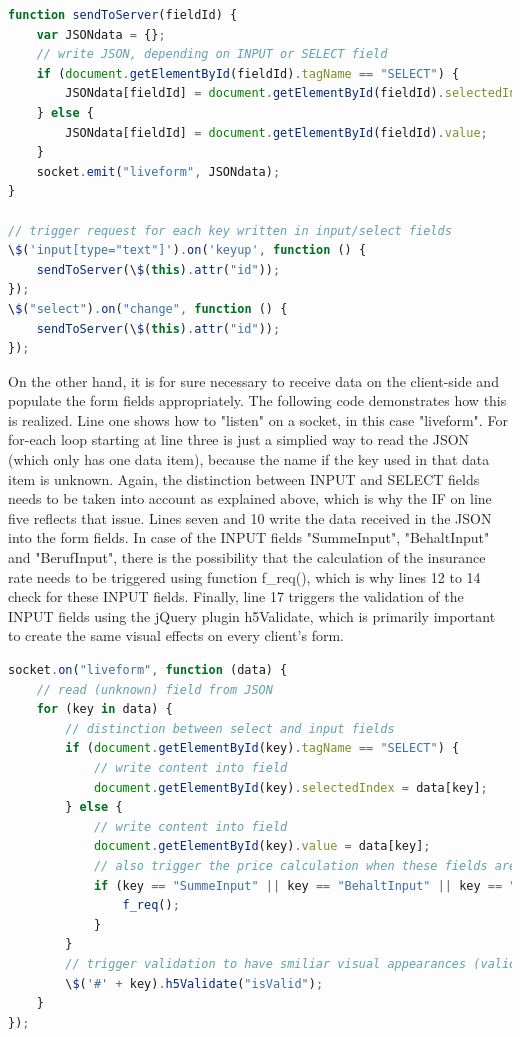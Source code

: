 \begin{lstlisting}[language=javascript,caption={Sending data to the server}]
function sendToServer(fieldId) {
    var JSONdata = {};
    // write JSON, depending on INPUT or SELECT field
    if (document.getElementById(fieldId).tagName == "SELECT") {
        JSONdata[fieldId] = document.getElementById(fieldId).selectedIndex;
    } else {
        JSONdata[fieldId] = document.getElementById(fieldId).value;
    }
    socket.emit("liveform", JSONdata);
}

// trigger request for each key written in input/select fields
\$('input[type="text"]').on('keyup', function () {
    sendToServer(\$(this).attr("id"));
});
\$("select").on("change", function () {
    sendToServer(\$(this).attr("id"));
});
\end{lstlisting}

On the other hand, it is for sure necessary to receive data on the client-side and populate the form fields appropriately. The following code demonstrates how this is realized. Line one shows how to "listen" on a socket, in this case "liveform". For for-each loop starting at line three is just a simplied way to read the JSON (which only has one data item), because the name if the key used in that data item is unknown. Again, the distinction between INPUT and SELECT fields needs to be taken into account as explained above, which is why the IF on line five reflects that issue. Lines seven and 10 write the data received in the JSON into the form fields. In case of the INPUT fields "SummeInput", "BehaltInput" and "BerufInput", there is the possibility that the calculation of the insurance rate needs to be triggered using function f\_req(), which is why lines 12 to 14 check for these INPUT fields. Finally, line 17 triggers the validation of the INPUT fields using the jQuery plugin h5Validate, which is primarily important to create the same visual effects on every client's form.

\begin{lstlisting}[language=javascript,caption={Receiving data using WebSockets}]
socket.on("liveform", function (data) {
    // read (unknown) field from JSON
    for (key in data) {
        // distinction between select and input fields
        if (document.getElementById(key).tagName == "SELECT") {
            // write content into field
            document.getElementById(key).selectedIndex = data[key];
        } else {
            // write content into field
            document.getElementById(key).value = data[key];
            // also trigger the price calculation when these fields are filled
            if (key == "SummeInput" || key == "BehaltInput" || key == "BerufInput") {
                f_req();
            }
        }
        // trigger validation to have smiliar visual appearances (valid/invalid) for the fields
        \$('#' + key).h5Validate("isValid");
    }
});
\end{lstlisting}

